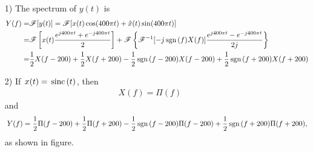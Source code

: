 \documentclass{assignment}
\begin{document}
\begin{sol}
    \begin{itemize}
        \item[1)] The spectrum of $y(t)$ is
        \begin{align}
            \notag Y(f)=&\mathscr{F}[y(t)]=\mathscr{F}[x(t)\cos(400\pi t)+\hat{x}(t)\sin(400\pi t)]\\
            \notag=&\mathscr{F}\left[x(t)\frac{e^{j400\pi t}+e^{-j400\pi t}}{2}\right]+\mathscr{F}\left\{\mathscr{F}^{-1}[-j\,\text{sgn}\,(f)X(f)]\frac{e^{j400\pi t}-e^{-j400\pi t}}{2j}\right\}\\
            =&\frac{1}{2}X(f-200)+\frac{1}{2}X(f+200)-\frac{1}{2}\,\text{sgn}\,(f-200)X(f-200)+\frac{1}{2}\,\text{sgn}\,(f+200)X(f+200)
        \end{align}
        \item[2)] If $x(t)=\,\text{sinc}\,(t)$, then
        \begin{align}
            X(f)=\Pi(f)
        \end{align}
        and
        \begin{align}
            Y(f)=\frac{1}{2}\Pi(f-200)+\frac{1}{2}\Pi(f+200)-\frac{1}{2}\,\text{sgn}\,(f-200)\Pi(f-200)+\frac{1}{2}\,\text{sgn}\,(f+200)\Pi(f+200),
        \end{align}
        as shown in figure.
        \begin{figure}[h]
            \centering

\end{figure}
\end{itemize}
\end{sol}
\end{document}
